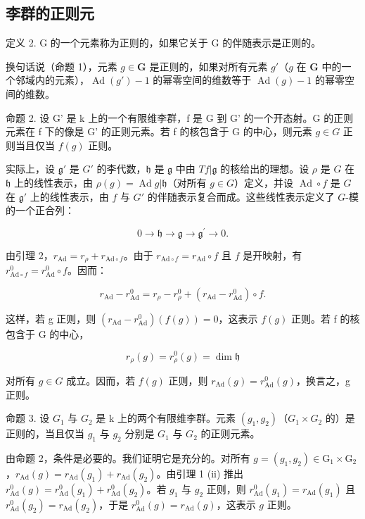 \subsection{李群的正则元}

定义 2. G 的一个元素称为正则的，如果它关于 G 的伴随表示是正则的。

换句话说（命题 1），元素 \(g \in \mathbf{G}\) 是正则的，如果对所有元素 \(g'\)（\(g\) 在 \(\mathbf{G}\) 中的一个邻域内的元素），\(\operatorname{Ad}(g') - 1\) 的幂零空间的维数等于 \(\operatorname{Ad}(g) - 1\) 的幂零空间的维数。

命题 2. 设 G' 是 k 上的一个有限维李群，f 是 G 到 G' 的一个开态射。G 的正则元素在 f 下的像是 G' 的正则元素。若 f 的核包含于 G 的中心，则元素 \(g \in G\) 正则当且仅当 \(f(g)\) 正则。

实际上，设 \(\mathfrak{g}'\) 是 \(G'\) 的李代数，\(\mathfrak{h}\) 是 \(\mathfrak{g}\) 中由 \(Tf|\mathfrak{g}\) 的核给出的理想。设 \(\rho\) 是 \(G\) 在 \(\mathfrak{h}\) 上的线性表示，由 \(\rho(g) = \operatorname{Ad} g|\mathfrak{h}\)（对所有 \(g \in G\)）定义，并设 \(\operatorname{Ad} \circ f\) 是 \(G\) 在 \(\mathfrak{g}'\) 上的线性表示，由 \(f\) 与 \(G'\) 的伴随表示复合而成。这些线性表示定义了 \(G\)-模的一个正合列：

\[
0 \to \mathfrak {h} \to \mathfrak {g} \to \mathfrak {g} ^ {\prime} \to 0.
\]

由引理 2，\(r_{\mathrm{Ad}} = r_{\rho} + r_{\mathrm{Ad}\circ f}\)。由于 \(r_{\mathrm{Ad}\circ f} = r_{\mathrm{Ad}}\circ f\) 且 \(f\) 是开映射，有 \(r_{\mathrm{Ad}\circ f}^{0} = r_{\mathrm{Ad}}^{0}\circ f\)。因而：

\[
r _ {\mathrm{Ad}} - r _ {\mathrm{Ad}} ^ {0} = r _ {\rho} - r _ {\rho} ^ {0} + \left(r _ {\mathrm{Ad}} - r _ {\mathrm{Ad}} ^ {0}\right) \circ f.
\]

这样，若 g 正则，则 \((r_{\mathrm{Ad}} - r_{\mathrm{Ad}}^{0})(f(g)) = 0\)，这表示 \(f(g)\) 正则。若 f 的核包含于 G 的中心，

\[
r _ {\rho} (g) = r _ {\rho} ^ {0} (g) = \dim \mathfrak {h}
\]

对所有 \(g \in G\) 成立。因而，若 \(f(g)\) 正则，则 \(r_{\mathrm{Ad}}(g) = r_{\mathrm{Ad}}^{0}(g)\)，换言之，g 正则。

命题 3. 设 \(G_{1}\) 与 \(G_{2}\) 是 k 上的两个有限维李群。元素 \((g_{1}, g_{2})\)（\(G_{1} \times G_{2}\) 的）是正则的，当且仅当 \(g_{1}\) 与 \(g_{2}\) 分别是 \(G_{1}\) 与 \(G_{2}\) 的正则元素。

由命题 2，条件是必要的。我们证明它是充分的。对所有 \(g = (g_{1}, g_{2}) \in \mathrm{G}_{1} \times \mathrm{G}_{2}\)，\(r_{\mathrm{Ad}}(g) = r_{\mathrm{Ad}}(g_{1}) + r_{\mathrm{Ad}}(g_{2})\)。由引理 1 (ii) 推出 \(r_{\mathrm{Ad}}^{0}(g) = r_{\mathrm{Ad}}^{0}(g_{1}) + r_{\mathrm{Ad}}^{0}(g_{2})\)。若 \(g_{1}\) 与 \(g_{2}\) 正则，则 \(r_{\mathrm{Ad}}^{0}(g_{1}) = r_{\mathrm{Ad}}(g_{1})\) 且 \(r_{\mathrm{Ad}}^{0}(g_{2}) = r_{\mathrm{Ad}}(g_{2})\)，于是 \(r_{\mathrm{Ad}}^{0}(g) = r_{\mathrm{Ad}}(g)\)，这表示 \(g\) 正则。

